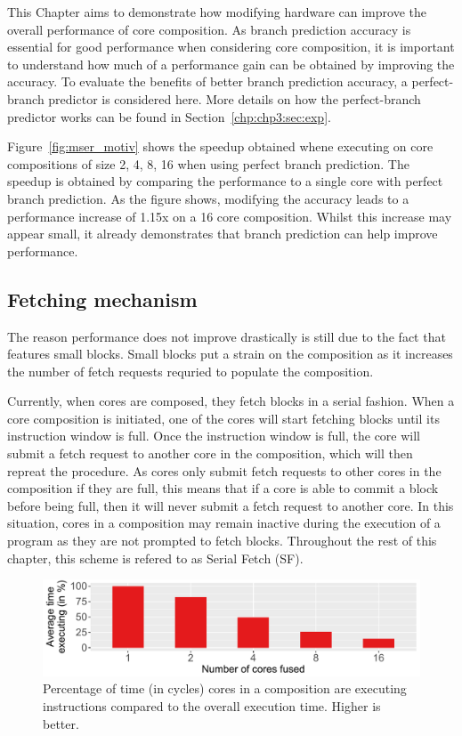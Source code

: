 This Chapter aims to demonstrate how modifying hardware can improve the overall performance of core composition.
As branch prediction accuracy is essential for good performance when considering core composition, it is important to understand how much of a performance gain can be obtained by improving the accuracy.
To evaluate the benefits of better branch prediction accuracy, a perfect-branch predictor is considered here.
More details on how the perfect-branch predictor works can be found in Section~\ref{chp:chp3:sec:exp}.


Figure~\ref{fig:mser_motiv} shows the speedup obtained whene executing  on core compositions of size 2, 4, 8, 16 when using perfect branch prediction.
The speedup is obtained by comparing the performance to a single core with perfect branch prediction.
As the figure shows, modifying the accuracy leads to a performance increase of 1.15x on a 16 core composition.
Whilst this increase may appear small, it already demonstrates that branch prediction can help improve performance.

\subsection{Fetching mechanism}

The reason performance does not improve drastically is still due to the fact that  features small blocks.
Small blocks put a strain on the composition as it increases the number of fetch requests requried to populate the composition.

Currently, when cores are composed, they fetch blocks in a serial fashion.
When a core composition is initiated, one of the cores will start fetching blocks until its instruction window is full.
Once the instruction window is full, the core will submit a fetch request to another core in the composition, which will then repreat the procedure.
As cores only submit fetch requests to other cores in the composition if they are full, this means that if a core is able to commit a block before being full, then it will never submit a fetch request to another core.
In this situation, cores in a composition may remain inactive during the execution of a program as they are not prompted to fetch blocks.
Throughout the rest of this chapter, this scheme is refered to as Serial Fetch (SF).%

\begin{figure}[t]
    \centering
    \includegraphics[width=1\textwidth]{chapter3/graphics/mser_active_16.pdf}
    \caption{Percentage of time (in cycles) cores in a composition are executing instructions compared to the overall execution time. Higher is better.}
    \label{fig:motivation_perc}
	\vspace{1em}
\end{figure}

